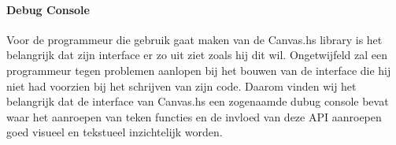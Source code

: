 \paragraph{Debug Console}
Voor de programmeur die gebruik gaat maken van de Canvas.hs library is het belangrijk dat zijn interface er zo uit ziet zoals hij dit wil. Ongetwijfeld zal een programmeur tegen problemen aanlopen bij het bouwen van de interface die hij niet had voorzien bij het schrijven van zijn code. Daarom vinden wij het belangrijk dat de interface van Canvas.hs een zogenaamde dubug console bevat waar het aanroepen van teken functies en de invloed van deze API aanroepen goed visueel en tekstueel inzichtelijk worden.
